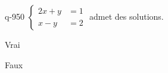 \begin{truefalse}{q-950}
$\begin{cases}2x+y &= 1 \\ x-y &= 2\end{cases}$ admet des solutions.
\item* Vrai
\item Faux
\end{truefalse}

